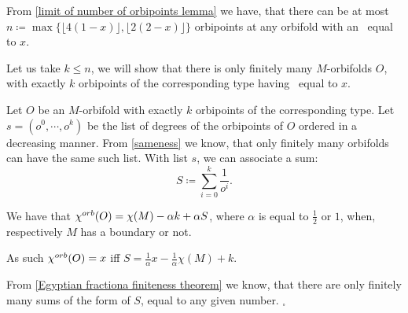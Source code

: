 From \ref{limit of number of orbipoints lemma} 
we have, that there can be at most 
$n \coloneqq \max \{\lfloor 4(1-x) \rfloor, \lfloor 2(2-x) \rfloor\}$ 
orbipoints at any orbifold with an \Eoc\ equal to $x$. 

Let us take $k\leq n$, we will show that there is only finitely many $M$-orbifolds $O$,
with exactly $k$ orbipoints of the corresponding type having \Eoc\ equal to $x$. 

Let $O$ be an $M$-orbifold with exactly $k$ orbipoints of the corresponding type. Let 
$s = (o^0, \cdots, o^{k})$ be the list of degrees of 
the orbipoints  
of $O$ ordered in a decreasing manner. From \ref{sameness} we know, that only finitely 
many orbifolds can have the same such list.  
With list $s$, we can associate a sum:
\begin{equation} 
S \coloneqq \sum_{i=0}^k \frac{1}{o^i}.
\end{equation} 

We have that ${\chi^{orb}(O)} = \chi(M) - \alpha k + \alpha S$, where $\alpha$ is 
equal to $\frac{1}{2}$ or $1$, when, respectively $M$ has a boundary or not. 

As such ${\chi^{orb}(O)} = x$ iff $S = \frac{1}{\alpha}x-\frac{1}{\alpha}\chi(M) + k$.  

From \ref{Egyptian fractiona finiteness theorem} we know, that there are only finitely many 
sums of the form of $S$, equal to any given number. $_\square $

 

